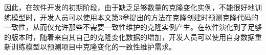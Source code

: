 因此，在软件开发的初期阶段，由于缺乏足够数量的克隆变化实例，不能很好地训练模型时，开发人员可以使用本文第3章提出的方法在克隆创建时预测克隆代码的一致性，从而仅允许那些不需要一致性维护的克隆实例产生。在软件演化到了足够的版本时，随着来自其自己的克隆变化数据的增加，开发人员可以使用自身数据重新训练模型以预测项目中克隆变化的一致性维护需求。


